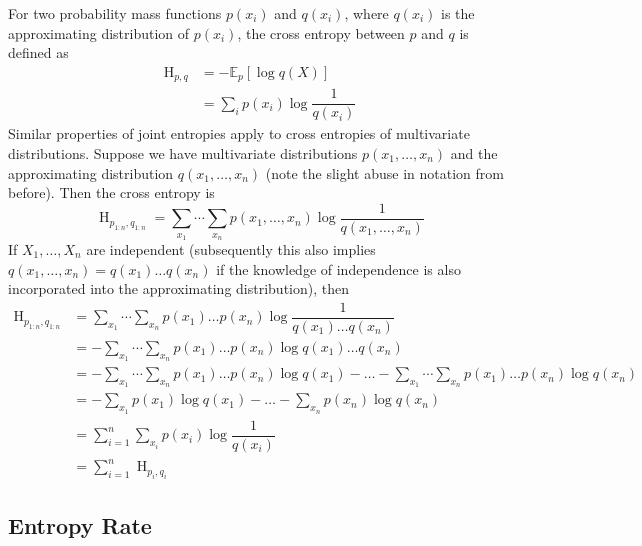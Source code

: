 \documentclass[11pt]{report} %
\begin{document}
For two probability mass functions $p\left(x_{i}\right)$ and $q\left(x_{i}\right)$, where $q\left(x_{i}\right)$ is the approximating distribution of $p\left(x_{i}\right)$, the cross entropy between $p$ and $q$ is defined as
\begin{align}
\operatorname{H}_{p, q} &= -\mathbb{E}_{p}\left[\log q\left(X\right)\right]\\
&= \sum_{i}p\left(x_{i}\right)\log\dfrac{1}{q\left(x_{i}\right)}
\end{align}
Similar properties of joint entropies apply to cross entropies of multivariate distributions. Suppose we have multivariate distributions $p\left(x_{1}, \dots, x_{n}\right)$ and the approximating distribution $q\left(x_{1}, \dots, x_{n}\right)$ (note the slight abuse in notation from before). Then the cross entropy is
\begin{equation}
\operatorname{H}_{p_{1:n}, q_{1:n}} = \sum_{x_{1}}\cdots\sum_{x_{n}}p\left(x_{1}, \dots, x_{n}\right)\log\dfrac{1}{q\left(x_{1}, \dots, x_{n}\right)}
\end{equation}
If $X_{1}, \dots, X_{n}$ are independent (subsequently this also implies $q\left(x_{1}, \dots, x_{n}\right) = q\left(x_{1}\right)\dots q\left(x_{n}\right)$ if the knowledge of independence is also incorporated into the approximating distribution), then
\begin{align}
\operatorname{H}_{p_{1:n}, q_{1:n}} &= \sum_{x_{1}}\cdots\sum_{x_{n}}p\left(x_{1}\right)\dots p\left(x_{n}\right)\log\dfrac{1}{q\left(x_{1}\right)\dots q\left(x_{n}\right)} \\
&= - \sum_{x_{1}}\cdots\sum_{x_{n}}p\left(x_{1}\right)\dots p\left(x_{n}\right)\log q\left(x_{1}\right)\dots q\left(x_{n}\right) \\
&= - \sum_{x_{1}}\cdots\sum_{x_{n}}p\left(x_{1}\right)\dots p\left(x_{n}\right)\log q\left(x_{1}\right) - \dots - \sum_{x_{1}}\cdots\sum_{x_{n}}p\left(x_{1}\right)\dots p\left(x_{n}\right)\log q\left(x_{n}\right) \\
&= - \sum_{x_{1}}p\left(x_{1}\right)\log q\left(x_{1}\right) - \dots - \sum_{x_{n}}p\left(x_{n}\right)\log q\left(x_{n}\right) \\
&= \sum_{i = 1}^{n}\sum_{x_{i}}p\left(x_{i}\right)\log\dfrac{1}{q\left(x_{i}\right)} \\
&= \sum_{i = 1}^{n}\operatorname{H}_{p_{i},q_{i}}
\end{align}

\subsection{Entropy Rate}
\end{document}
